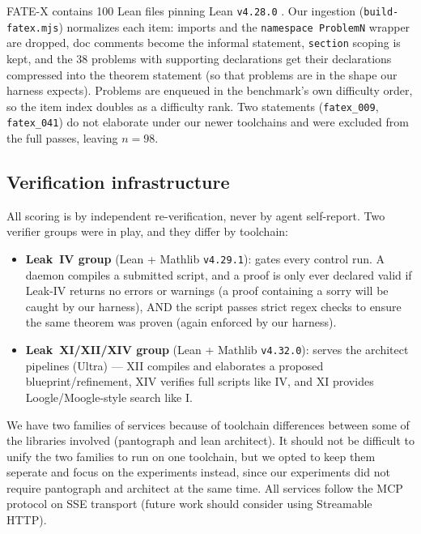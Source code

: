 \documentclass[12pt, a4paper]{article}
\newcommand{\run}[1]{\texttt{#1}}
\begin{document}
FATE-X contains 100 Lean files pinning Lean \texttt{v4.28.0} \cite{fatex428}.
Our ingestion (\run{build-fatex.mjs}) normalizes each item: imports and the
\texttt{namespace ProblemN} wrapper are dropped, doc comments become the
informal statement, \texttt{section} scoping is kept, and the 38 problems with
supporting declarations get their declarations compressed into the theorem statement 
(so that problems are in the shape our harness expects). Problems are enqueued
in the benchmark's own difficulty order, so the item index doubles as a
difficulty rank. Two statements (\run{fatex\_009}, \run{fatex\_041}) do not
elaborate under our newer toolchains and were excluded from the full passes,
leaving $n=98$.

\subsection{Verification infrastructure}
\label{sec:verifiers}

All scoring is by independent re-verification, never by agent self-report.
Two verifier groups were in play, and they differ by toolchain:

\begin{itemize}[itemsep=1pt]
  \item \textbf{Leak~IV group} (Lean + Mathlib \texttt{v4.29.1}): gates every
        control run. A daemon compiles a submitted script, and a proof is only ever
        declared valid if Leak-IV returns no errors or warnings (a proof containing a sorry
        will be caught by our harness), AND the script passes strict
        regex checks to ensure the same theorem was proven (again enforced by our harness).
  \item \textbf{Leak~XI/XII/XIV group} (Lean + Mathlib \texttt{v4.32.0}):
        serves the architect pipelines (Ultra) --- XII compiles and
        elaborates a proposed blueprint/refinement, XIV verifies full scripts like IV, and XI provides Loogle/Moogle-style
        search \cite{loogle,moogle} like I.
\end{itemize}

\noindent
We have two families of services because of toolchain differences between some of the libraries involved (pantograph and lean architect).
It should not be difficult to unify the two families to run on one toolchain, but we opted to keep them seperate and
focus on the experiments instead, since our experiments did not require pantograph and architect at the same time. 
All services follow the MCP protocol on SSE transport \cite{anthropic2024mcp} (future work should consider using Streamable HTTP).
\end{document}
